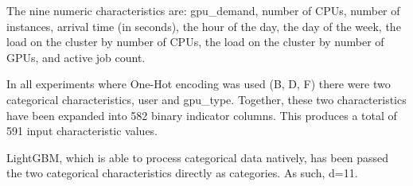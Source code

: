 \begin{table}[H]
\centering
\caption[Dataset dimensions and feature configuration]{Dataset dimensions and feature configuration per experiment. $d$ denotes the number of input features. All experiments use the same chronological 80/20 train/test split.}
\label{tab:data-summary}
\end{table}

The nine numeric characteristics are: gpu\_demand, number of CPUs, number of instances, arrival time (in seconds), the hour of the day, the day of the week, the load on the cluster by number of CPUs, the load on the cluster by number of GPUs, and active job count.

In all experiments where One-Hot encoding was used (B, D, F) there were two categorical characteristics, user and gpu\_type. Together, these two characteristics have been expanded into 582 binary indicator columns. This produces a total of 591 input characteristic values.

LightGBM, which is able to process categorical data natively, has been passed the two categorical characteristics directly as categories. As such, d=11.

